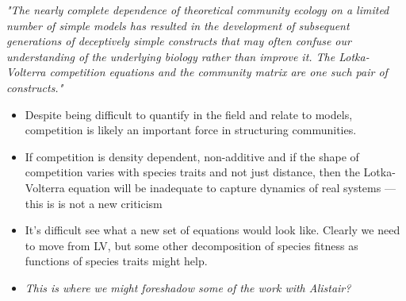 \documentclass[a4paper,11pt]{article}
\begin{document}
\emph{"The nearly complete dependence of theoretical community ecology on a
limited number of simple models has resulted in the development of subsequent
generations of deceptively simple constructs that may often confuse our
understanding of the underlying biology rather than improve it. The 
Lotka-Volterra competition equations and the community matrix are one such 
pair of constructs."} \citep{Neill-1974}

\begin{itemize}
\item Despite being difficult to quantify in the field and relate to
  models, competition is likely an important force in structuring
  communities.
\item If competition is density dependent, non-additive and if the
  shape of competition varies with species traits and not just
  distance, then the Lotka-Volterra equation will be inadequate to
  capture dynamics of real systems --- this is is not a new criticism
  \citep[e.g., see][: ``The nearly complete dependence of theoretical
  community ecology on a limited number of simple
  models'']{Neill-1974}
\item It's difficult see what a new set of equations would look like.
  Clearly we need to move from LV, but some other decomposition of
  species fitness as functions of species traits might help.
\item \textit{This is where we might foreshadow some of the work with
    Alistair?}
\end{itemize}
\end{document}
